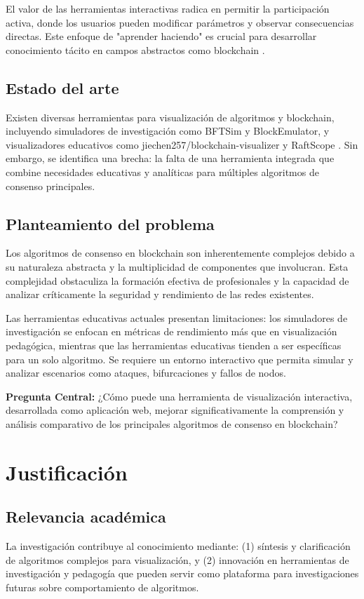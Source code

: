 \documentclass[spanish,12pt,letterpaper]{report}
\begin{document}
El valor de las herramientas interactivas radica en permitir la participación activa, donde los usuarios pueden modificar parámetros y observar consecuencias directas. Este enfoque de "aprender haciendo" es crucial para desarrollar conocimiento tácito en campos abstractos como blockchain \parencite{chronicle2025impact}.

\subsection{Estado del arte}
Existen diversas herramientas para visualización de algoritmos y blockchain, incluyendo simuladores de investigación como BFTSim y BlockEmulator, y visualizadores educativos como jiechen257/blockchain-visualizer y RaftScope \parencite{github2025jiechen257, raftgithub2025raft}. Sin embargo, se identifica una brecha: la falta de una herramienta integrada que combine necesidades educativas y analíticas para múltiples algoritmos de consenso principales.

\subsection{Planteamiento del problema}
Los algoritmos de consenso en blockchain son inherentemente complejos debido a su naturaleza abstracta y la multiplicidad de componentes que involucran. Esta complejidad obstaculiza la formación efectiva de profesionales y la capacidad de analizar críticamente la seguridad y rendimiento de las redes existentes.

Las herramientas educativas actuales presentan limitaciones: los simuladores de investigación se enfocan en métricas de rendimiento más que en visualización pedagógica, mientras que las herramientas educativas tienden a ser específicas para un solo algoritmo. Se requiere un entorno interactivo que permita simular y analizar escenarios como ataques, bifurcaciones y fallos de nodos.

\textbf{Pregunta Central:} ¿Cómo puede una herramienta de visualización interactiva, desarrollada como aplicación web, mejorar significativamente la comprensión y análisis comparativo de los principales algoritmos de consenso en blockchain?

\section{Justificación}
\subsection{Relevancia académica}
La investigación contribuye al conocimiento mediante: (1) síntesis y clarificación de algoritmos complejos para visualización, y (2) innovación en herramientas de investigación y pedagogía que pueden servir como plataforma para investigaciones futuras sobre comportamiento de algoritmos.
\end{document}
